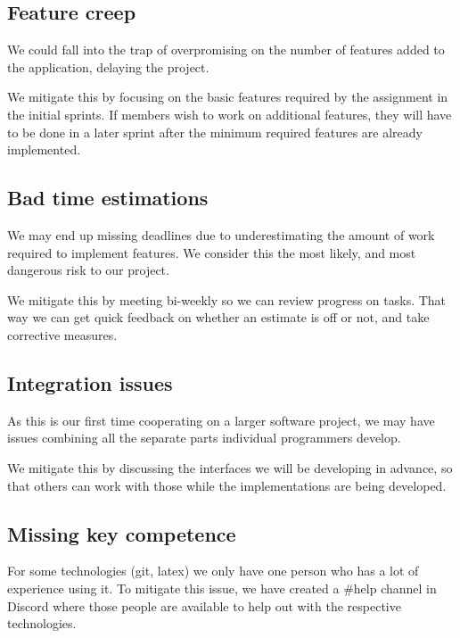 \documentclass{article}
\begin{document}
\subsection*{Feature creep}

We could fall into the trap of overpromising on the number of features added to the application, delaying the project.

We mitigate this by focusing on the basic features required by the assignment in the initial sprints. If members wish to work on additional features, they will have to be done in a later sprint after the minimum required features are already implemented.

\subsection*{Bad time estimations}

We may end up missing deadlines due to underestimating the amount of work required to implement features. We consider this the most likely, and most dangerous risk to our project.

We mitigate this by meeting bi-weekly so we can review progress on tasks. That way we can get quick feedback on whether an estimate is off or not, and take corrective measures.

\subsection*{Integration issues}

As this is our first time cooperating on a larger software project, we may have issues combining all the separate parts individual programmers develop.

We mitigate this by discussing the interfaces we will be developing in advance, so that others can work with those while the implementations are being developed.

\subsection*{Missing key competence}

For some technologies (git, latex) we only have one person who has a lot of experience using it. To mitigate this issue, we have created a \#help channel in Discord where those people are available to help out with the respective technologies.
\end{document}
